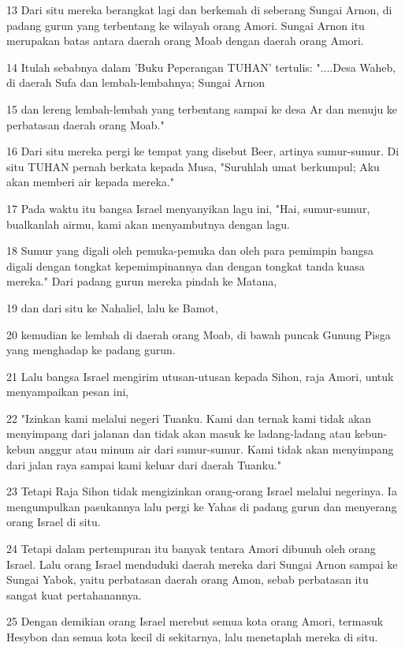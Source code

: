 \par 13 Dari situ mereka berangkat lagi dan berkemah di seberang Sungai Arnon, di padang gurun yang terbentang ke wilayah orang Amori. Sungai Arnon itu merupakan batas antara daerah orang Moab dengan daerah orang Amori.
\par 14 Itulah sebabnya dalam 'Buku Peperangan TUHAN' tertulis: "....Desa Waheb, di daerah Sufa dan lembah-lembahnya; Sungai Arnon
\par 15 dan lereng lembah-lembah yang terbentang sampai ke desa Ar dan menuju ke perbatasan daerah orang Moab."
\par 16 Dari situ mereka pergi ke tempat yang disebut Beer, artinya sumur-sumur. Di situ TUHAN pernah berkata kepada Musa, "Suruhlah umat berkumpul; Aku akan memberi air kepada mereka."
\par 17 Pada waktu itu bangsa Israel menyanyikan lagu ini, "Hai, sumur-sumur, bualkanlah airmu, kami akan menyambutnya dengan lagu.
\par 18 Sumur yang digali oleh pemuka-pemuka dan oleh para pemimpin bangsa digali dengan tongkat kepemimpinannya dan dengan tongkat tanda kuasa mereka." Dari padang gurun mereka pindah ke Matana,
\par 19 dan dari situ ke Nahaliel, lalu ke Bamot,
\par 20 kemudian ke lembah di daerah orang Moab, di bawah puncak Gunung Pisga yang menghadap ke padang gurun.
\par 21 Lalu bangsa Israel mengirim utusan-utusan kepada Sihon, raja Amori, untuk menyampaikan pesan ini,
\par 22 "Izinkan kami melalui negeri Tuanku. Kami dan ternak kami tidak akan menyimpang dari jalanan dan tidak akan masuk ke ladang-ladang atau kebun-kebun anggur atau minum air dari sumur-sumur. Kami tidak akan menyimpang dari jalan raya sampai kami keluar dari daerah Tuanku."
\par 23 Tetapi Raja Sihon tidak mengizinkan orang-orang Israel melalui negerinya. Ia mengumpulkan pasukannya lalu pergi ke Yahas di padang gurun dan menyerang orang Israel di situ.
\par 24 Tetapi dalam pertempuran itu banyak tentara Amori dibunuh oleh orang Israel. Lalu orang Israel menduduki daerah mereka dari Sungai Arnon sampai ke Sungai Yabok, yaitu perbatasan daerah orang Amon, sebab perbatasan itu sangat kuat pertahanannya.
\par 25 Dengan demikian orang Israel merebut semua kota orang Amori, termasuk Hesybon dan semua kota kecil di sekitarnya, lalu menetaplah mereka di situ.

